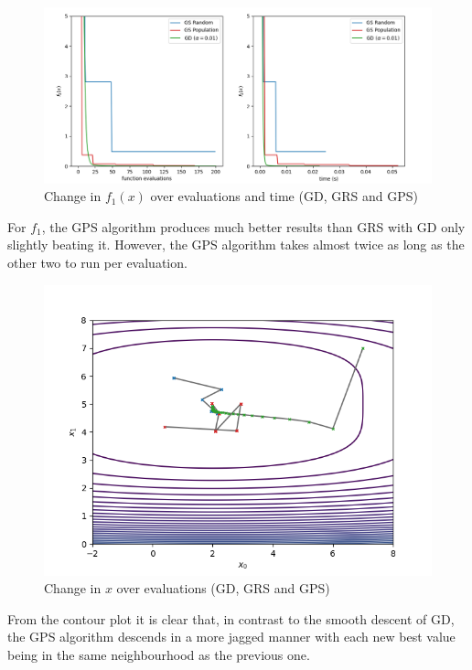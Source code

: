 \documentclass[12pt]{article}
\begin{document}
\begin{figure}[h]
    \centering
    \includegraphics[scale=0.55]{figs/ab/b_ii_1.png}
    \caption{Change in $f_1(x)$ over evaluations and time (GD, GRS and GPS)}
    \label{fig:b_ii_1}
\end{figure}

For $f_1$, the GPS algorithm produces much better results than GRS with GD only slightly beating it. However, the GPS algorithm takes almost twice as long as the other two to run per evaluation.

\begin{figure}[h]
    \centering
    \includegraphics[scale=0.55]{figs/ab/b_ii_1_cont.png}
    \caption{Change in $x$ over evaluations (GD, GRS and GPS)}
    \label{fig:b_ii_1_cont}
\end{figure}

From the contour plot it is clear that, in contrast to the smooth descent of GD, the GPS algorithm descends in a more jagged manner with each new best value being in the same neighbourhood as the previous one.
\end{document}
